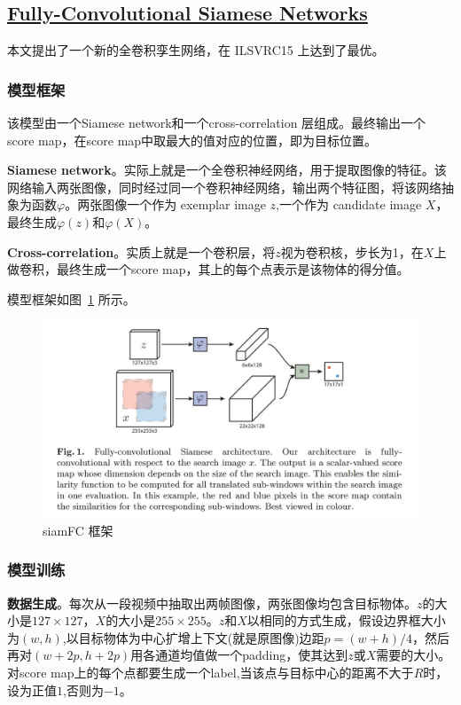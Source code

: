 \documentclass[]{article}
\begin{document}
\subsection{\href{./papers/Fully-Convolutional Siamese Networks.pdf}{Fully-Convolutional Siamese Networks}}
\label{SiamFC}

本文提出了一个新的全卷积孪生网络，在 ILSVRC15 上达到了最优。
\subsubsection{模型框架}
该模型由一个Siamese network和一个cross-correlation 层组成。最终输出一个 score map，在score map中取最大的值对应的位置，即为目标位置。

\textbf{Siamese network}。实际上就是一个全卷积神经网络，用于提取图像的特征。该网络输入两张图像，同时经过同一个卷积神经网络，输出两个特征图，将该网络抽象为函数$\varphi$。两张图像一个作为 exemplar image $z$,一个作为 candidate image $X$，最终生成$\varphi (z)$和$\varphi (X)$。

\textbf{Cross-correlation}。实质上就是一个卷积层，将$z$视为卷积核，步长为1，在$X$上做卷积，最终生成一个score map，其上的每个点表示是该物体的得分值。

模型框架如图~\ref{siamFC_architecture} 所示。

\begin{figure}
	\centering
	\includegraphics[width=0.7\linewidth]{./images/siaFC.jpg} 
	\caption{siamFC 框架}
	\label{siamFC_architecture} 
\end{figure}

\subsubsection{模型训练}
\textbf{数据生成}。每次从一段视频中抽取出两帧图像，两张图像均包含目标物体。$z$的大小是$127\times 127$，$X$的大小是$255\times 255$。$z$和$X$以相同的方式生成，假设边界框大小为$(w,h)$,以目标物体为中心扩增上下文(就是原图像)边距$p=(w+h)/4$，然后再对$(w+2p,h+2p)$用各通道均值做一个padding，使其达到$z$或$X$需要的大小。对score map上的每个点都要生成一个label,当该点与目标中心的距离不大于$R$时，设为正值$1$,否则为$-1$。
\end{document}
